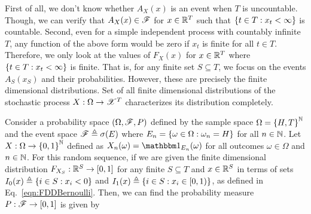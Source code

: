 \documentclass[letterpaper,10pt,english]{article}
\begin{document}
First of all, we don't know whether $A_X(x)$ is an event when $T$ is uncountable. 
Though, we can verify that $A_X(x) \in \mathscr{F}$ for $x \in \mathbb{R}^T$ such that $\left\{t \in T: x_t < \infty\right\}$ is countable. 
Second, even for a simple independent process with countably infinite $T$, 
any function of the above form would be zero if $x_t$ is finite for all $t \in T$. 
Therefore, we only look at the values of $F_X(x)$ for $x \in \mathbb{R}^T$ where $\left\{t \in T: x_t < \infty\right\}$ is finite. 
That is, for any finite set $S \subseteq T$, we focus on the events $A_S(x_S)$ and their probabilities. 
However, these are precisely the finite dimensional distributions.  
Set of all finite dimensional distributions of the stochastic process $X: \Omega \to \mathscr{X}^T$ characterizes its distribution completely. 
\begin{shaded}
\begin{exmp}
Consider a probability space $(\Omega,\mathscr{F}, P)$ defined by the sample space $\Omega = \left\{H,T\right\}^{\mathbb{N}}$ and the event space $\mathscr{F} \triangleq \sigma(E)$ where $E_n = \left\{\omega \in \Omega: \omega_n = H\right\}$ for all $n\in\mathbb{N}$. 
Let $X: \Omega\to\left\{0,1\right\}^{\mathbb{N}}$ defined as $X_n(\omega) = \Ind{E_n}(\omega)$ for all outcomes $\omega \in \Omega$ and $n \in \mathbb{N}$. 
For this random sequence, if we are given the finite dimensional distribution $F_{X_S}: \mathbb{R}^S \to [0,1]$ for any finite $S \subseteq T$ and $x \in \mathbb{R}^S$ in terms of sets $ I_0(x) \triangleq \left\{i \in S: x_i < 0\right\}$ and $I_1(x) \triangleq \left\{i \in S: x_i \in [0,1)\right\}$, 
as defined in Eq.~\eqref{eqn:FDDBernoulli}. 
Then, we can find the probability measure $P: \mathscr{F} \to [0,1]$ is given by 

\end{exmp}
\end{shaded}
\end{document}
